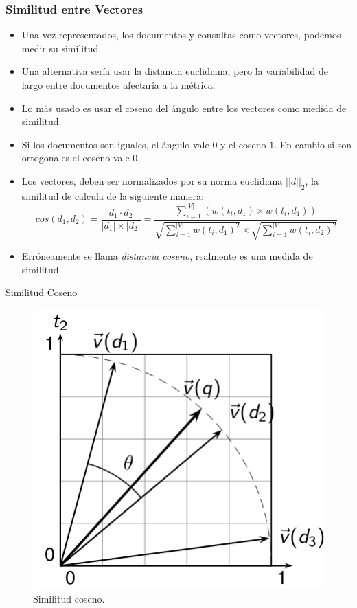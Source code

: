 \documentclass[mathserif]{beamer}
\begin{document}
\begin{frame}\frametitle{Similitud entre Vectores}
\footnotesize{
\begin{itemize}
 \item Una vez representados, los documentos y consultas como vectores, podemos medir su similitud.
 \item Una alternativa sería usar la distancia euclidiana, pero la variabilidad de largo entre documentos afectaría a la métrica.
 \item Lo más usado es usar el coseno del ángulo entre los vectores como medida de similitud.
 \item Si los documentos son iguales, el ángulo vale $0$ y el coseno $1$. En cambio si son ortogonales el coseno vale $0$.
 \item Los vectores, deben ser normalizados por su norma euclidiana $||d||_{2}$, la similitud de calcula de la siguiente manera:  
 \begin{displaymath}
 cos(d_{1},d_{2})= \frac{d_{1}\cdot d_{2}}{|d_{1}|\times|d_{2}|} = \frac{\sum_{i=1}^{|V|}(w(t_{i},d_{1})\times w(t_{i},d_{1}))}{\sqrt{\sum_{i=1}^{|V|} w(t_{i},d_{1})^2}\times \sqrt{\sum_{i=1}^{|V|} w(t_{i},d_{2})^2}}
\end{displaymath}
\item Erróneamente se llama \emph{distancia coseno}, realmente es una medida de similitud.


\end{itemize}


}
\end{frame}

\begin{frame}{Similitud Coseno}

\begin{figure}[h!]
	\centering
	\includegraphics[scale=0.5]{pics/cos.png}
	\caption{ Similitud coseno.}
\end{figure}

\end{frame}
\end{document}
